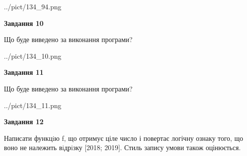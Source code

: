 \documentclass[12pt, ukrainian]{article}
\begin{document}
{\begin {large}
\begin{center}
	{../pict/134_94.png}
\end{center}
\newpage

{\begin {center}\textbf{Завдання 10}\end {center}}

Що буде виведено за виконання програми?\par
\begin{center}
	{../pict/134_10.png}
\end{center}
\newpage

{\begin {center}\textbf{Завдання 11}\end {center}}

Що буде виведено за виконання програми?\par
\begin{center}
	{../pict/134_11.png}
\end{center}
\newpage

{\begin {center}\textbf{Завдання 12}\end {center}}


Написати функцiю f, що отримує ціле число і повертає логічну ознаку того, що воно не належить вiдрiзку [2018; 2019]. Стиль запису умови також оцінюється.\par
\newpage

\end {large}}
\end{document}
